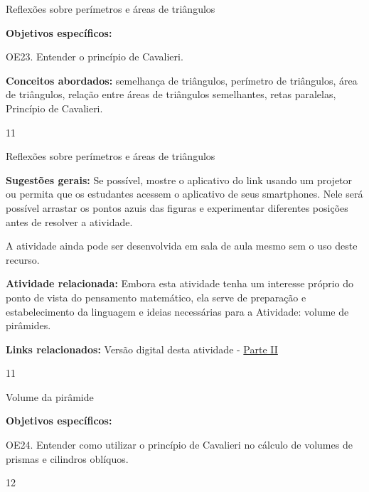 \clearpage
\def\currentcolor{session2}
\begin{objectives}{Reflexões sobre perímetros e áreas de triângulos}
{
\textbf{Objetivos específicos:}

OE23. Entender o princípio de Cavalieri.

\textbf{Conceitos abordados:} semelhança de triângulos, perímetro de triângulos, área de triângulos, relação entre áreas de triângulos semelhantes, retas paralelas, Princípio de Cavalieri.
}{1}{1}
\end{objectives}
\begin{sugestions}{Reflexões sobre perímetros e áreas de triângulos}
{
\textbf{Sugestões gerais:} Se possível, mostre o aplicativo do link usando um projetor ou permita que os estudantes acessem o aplicativo de seus smartphones. Nele será possível arrastar os pontos azuis das figuras e experimentar diferentes posições antes de resolver a atividade.

A atividade ainda pode ser desenvolvida em sala de aula mesmo sem o uso deste recurso.

\textbf{Atividade relacionada:} Embora esta atividade tenha um interesse próprio do ponto de vista do pensamento matemático, ela serve de preparação e estabelecimento da linguagem e ideias necessárias para a Atividade: volume de pirâmides.

\textbf{Links relacionados:} Versão digital desta atividade - \href{https://ggbm.at/vhxy7mp3}{Parte II}
}{1}{1}
\end{sugestions}
\clearmargin
\begin{objectives}{Volume da pirâmide}
{
\textbf{Objetivos específicos:}

OE24. Entender como utilizar o princípio de Cavalieri no cálculo de volumes de prismas e cilindros oblíquos.
}{1}{2}
\end{objectives}
